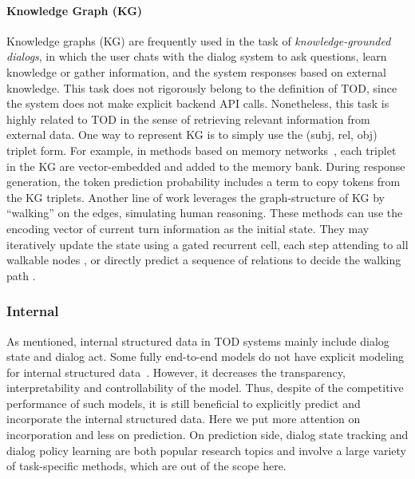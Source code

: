 \documentclass[11pt,dvipdfm]{article}
\begin{document}
\paragraph{Knowledge Graph (KG)}
Knowledge graphs (KG) are frequently used in the task of \textit{knowledge-grounded dialogs}, in which the user chats with the dialog system to ask questions, learn knowledge or gather information, and the system responses based on external knowledge. This task does not rigorously belong to the definition of TOD, since the system does not make explicit backend API calls. Nonetheless, this task is highly related to TOD in the sense of retrieving relevant information from external data.
One way to represent KG is to simply use the (subj, rel, obj) triplet form. For example, in methods based on memory networks~\cite{mem2seq,wmm2seq}, each triplet in the KG are vector-embedded and added to the memory bank. During response generation, the token prediction probability includes a term to copy tokens from the KG triplets.
Another line of work leverages the graph-structure of KG by ``walking'' on the edges, simulating human reasoning.
These methods can use the encoding vector of current turn information as the initial state.
They may iteratively update the state using a gated recurrent cell, each step attending to all walkable nodes \cite{moon2019OpenDialKG}, or directly predict a sequence of relations to decide the walking path \cite{cohen2020ScalableNeural,tuan2022TowardsLI}.


\subsubsection{Internal}

As mentioned, internal structured data in TOD systems mainly include dialog state and dialog act. Some fully end-to-end models do not have explicit modeling for internal structured data~\cite{mem2seq,wmm2seq}. However, it decreases the transparency, interpretability and controllability of the model. Thus, despite of the competitive performance of such models, it is still beneficial to explicitly predict and incorporate the internal structured data. Here we put more attention on incorporation and less on prediction. On prediction side, dialog state tracking and dialog policy learning are both popular research topics and involve a large variety of task-specific methods, which are out of the scope here.
\end{document}
